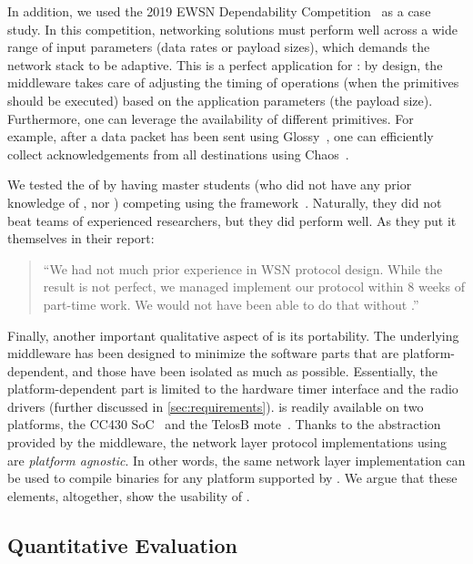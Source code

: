In addition, we used the 2019 EWSN Dependability Competition~\cite{DepComp2019} as a case study.
In this competition, networking solutions must perform well across a wide range of input parameters (\eg data rates or payload sizes), which demands the network stack to be adaptive.
This is a perfect application for \baloo: by design, the middleware takes care of adjusting the timing of operations (\ie when the \ST primitives should be executed) based on the application parameters (\eg the payload size).
%
Furthermore, one can leverage the availability of different primitives. For example, after a data packet has been sent using Glossy~\cite{ferrari2011Glossy}, one can efficiently collect acknowledgements from all destinations using Chaos~\cite{landsiedel2013Chaos}.

We tested the  of \baloo by having master students (who did not have any prior knowledge of \baloo, nor \ST) competing using the framework~\cite{mueller2019Competition}.
Naturally, they did not beat teams of experienced researchers, but they did perform well.
As they put it themselves in their report:
\begin{quote}
	``We had not much prior experience in WSN protocol design. While the result is not perfect, we managed implement our protocol within 8 weeks of part-time work. We would not have been able to do that without \baloo.''~\cite{schaper2019LowPower,mueller2019Lowpower}
\end{quote}



Finally, another important qualitative aspect of \baloo is its portability. The underlying middleware has been designed to minimize the software parts that are platform-dependent, and those have been isolated as much as possible.
Essentially, the platform-dependent part is limited to the hardware timer interface and the radio drivers (further discussed in \cref{sec:requirements}).
%
\baloo is readily available on two platforms, the CC430 SoC~\cite{CC430F6137} and the TelosB mote~\cite{TelosB}.
Thanks to the abstraction provided by the middleware, the network layer protocol implementations using \baloo are \textsl{platform agnostic}. In other words, the same network layer implementation can be used to compile binaries for any platform supported by \baloo.
%
We argue that these elements, altogether, show the usability of \baloo.

\subsection{Quantitative Evaluation}
\label{subsec:overhead}


